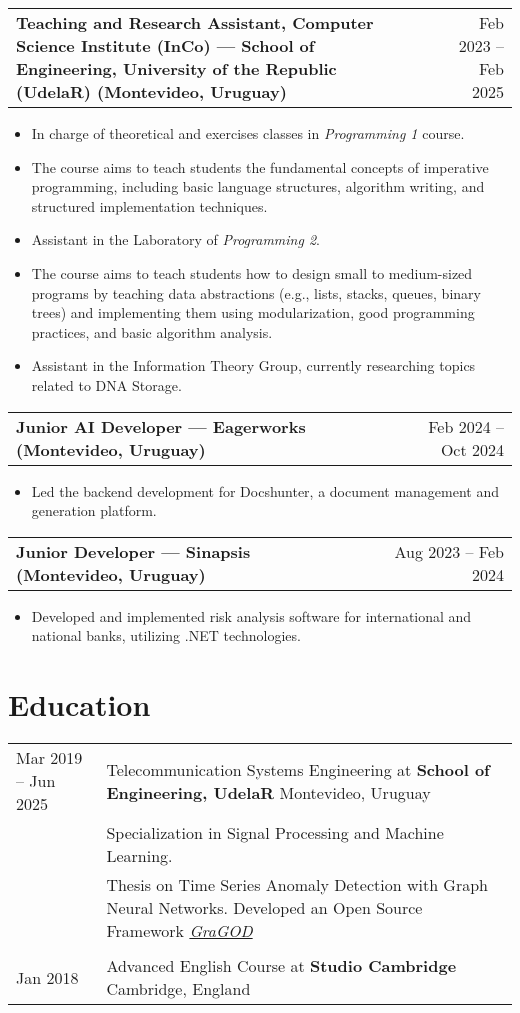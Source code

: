 \documentclass[a4paper,12pt]{article}
\makeatletter
\newenvironment{joblong}[2]
    {
    \begin{tabularx}{\linewidth}{@{}l X r@{}}
    \textbf{#1} & \hfill &  #2 \\[3.75pt]
    \end{tabularx}
    \begin{minipage}[t]{\linewidth}
    \begin{itemize}[nosep,after=\strut, leftmargin=1em, itemsep=3pt,label=--]
    }
    {
    \end{itemize}
    \end{minipage}    
    }
\makeatother
\begin{document}
\begin{joblong}{Teaching and Research Assistant, Computer Science Institute (InCo) — School of Engineering, University of the Republic (UdelaR) (Montevideo, Uruguay)}{Feb 2023 -- Feb 2025}
\item In charge of theoretical and exercises classes in \textit{Programming 1} course.
\item The course aims to teach students the fundamental concepts of imperative programming, including basic language structures, algorithm writing, and structured implementation techniques.
\item Assistant in the Laboratory of \textit{Programming 2}.
\item The course aims to teach students how to design small to medium-sized programs by teaching data abstractions (e.g., lists, stacks, queues, binary trees) and implementing them using modularization, good programming practices, and basic algorithm analysis.
\item Assistant in the Information Theory Group, currently researching topics related to DNA Storage.
\end{joblong}

\begin{joblong}{Junior AI Developer — Eagerworks (Montevideo, Uruguay)}{Feb 2024 -- Oct 2024}
\item Led the backend development for Docshunter, a document management and generation platform.
\end{joblong}

\begin{joblong}{Junior Developer — Sinapsis (Montevideo, Uruguay)}{Aug 2023 -- Feb 2024}
\item Developed and implemented risk analysis software for international and national banks, utilizing .NET technologies.
\end{joblong}
  

\section{Education}
\begin{tabularx}{\linewidth}{@{}l X@{}}	
Mar 2019 -- Jun 2025 & Telecommunication Systems Engineering at \textbf{School of Engineering, UdelaR} \hfill Montevideo, Uruguay \\
& Specialization in Signal Processing and Machine Learning. \\
& Thesis on Time Series Anomaly Detection with Graph Neural Networks. Developed an Open Source Framework \href{https://github.com/GraGODs/GraGOD}{\textit{GraGOD}} \\
\\
Jan 2018 & Advanced English Course at \textbf{Studio Cambridge} \hfill Cambridge, England \\
\end{tabularx}
\end{document}
